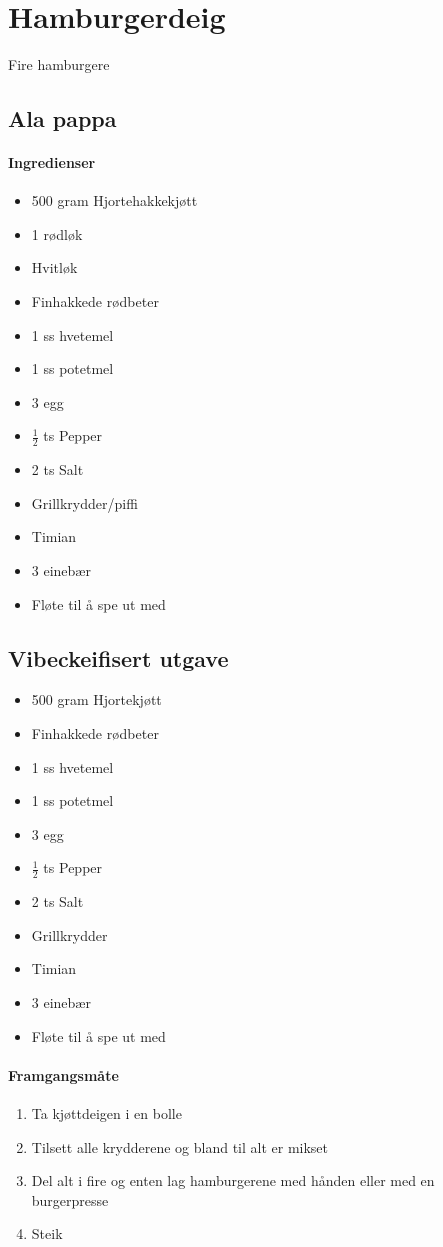 \section{﻿Hamburgerdeig}
Fire hamburgere

\subsection{Ala pappa}
\paragraph{Ingredienser}
\begin{itemize}[noitemsep]
	\item 500 gram Hjortehakkekjøtt
	\item	1 rødløk
	\item	Hvitløk
	\item	Finhakkede rødbeter
	\item	1 ss hvetemel
	\item	1 ss potetmel
	\item	3 egg
	\item	$\frac{1}{2}$  ts Pepper
	\item	2 ts Salt
	\item	Grillkrydder/piffi
	\item	Timian
	\item	3 einebær
	\item	Fløte til å spe ut med
\end{itemize}

\subsection{Vibeckeifisert utgave}
\begin{itemize}[noitemsep]
	\item 500 gram Hjortekjøtt
	\item	Finhakkede rødbeter
	\item	1 ss hvetemel
	\item	1 ss potetmel
	\item	3 egg
	\item	 $\frac{1}{2}$  ts Pepper
	\item	2 ts Salt
	\item	Grillkrydder
	\item	Timian
	\item	3 einebær
	\item	Fløte til å spe ut med
\end{itemize}

\paragraph{Framgangsmåte}
\begin{enumerate}[noitemsep]
	\item Ta kjøttdeigen i en bolle
	\item Tilsett alle krydderene og bland til alt er mikset
	\item Del alt i fire og enten lag hamburgerene med hånden eller med en burgerpresse
	\item Steik
\end{enumerate}
